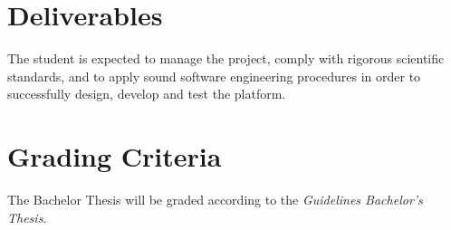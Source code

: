 \documentclass[a4paper, oneside]{description}
\begin{document}
\section*{Deliverables}

The student is expected to manage the project, comply with rigorous scientific standards,
and to apply sound software engineering procedures in order to successfully design, develop
and test the platform.

\section*{Grading Criteria}

The Bachelor Thesis will be graded according to the \emph{Guidelines Bachelor’s Thesis}\cite{BscThesisGuidelines}.




\end{document}
